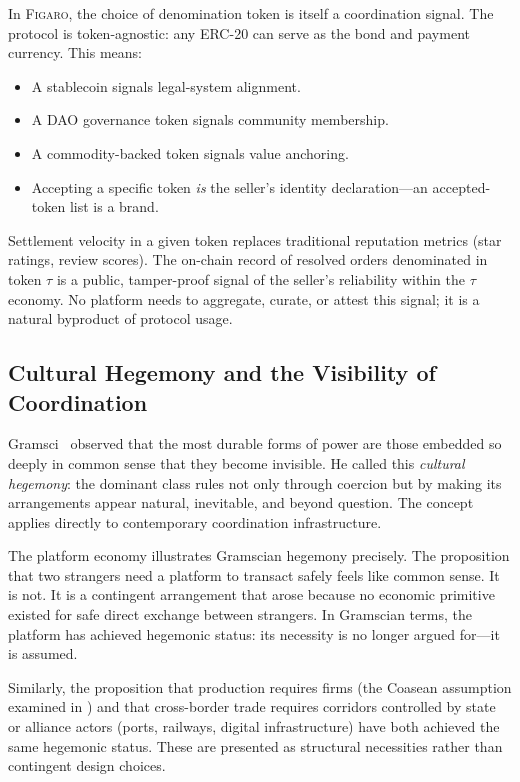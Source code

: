 \documentclass[11pt,a4paper]{article}
\theoremstyle{definition}
\theoremstyle{remark}
\newcommand{\figaro}{\textsc{Figaro}}
\begin{document}
In \figaro{}, the choice of denomination token is itself a coordination
signal. The protocol is token-agnostic: any ERC-20 can serve as
the bond and payment currency. This means:

\begin{itemize}
  \item A stablecoin signals legal-system alignment.
  \item A DAO governance token signals community membership.
  \item A commodity-backed token signals value anchoring.
  \item Accepting a specific token \emph{is} the seller's identity
    declaration---an accepted-token list is a brand.
\end{itemize}

Settlement velocity in a given token replaces traditional reputation
metrics (star ratings, review scores). The on-chain record of resolved
orders denominated in token $\tau$ is a public, tamper-proof signal of
the seller's reliability within the $\tau$ economy. No platform needs to
aggregate, curate, or attest this signal; it is a natural byproduct of
protocol usage.

\subsection{Cultural Hegemony and the Visibility of Coordination}

Gramsci~\citeyearpar{gramsci1971} observed that the most durable forms of
power are those embedded so deeply in common sense that they become
invisible. He called this \emph{cultural hegemony}: the dominant class
rules not only through coercion but by making its arrangements appear
natural, inevitable, and beyond question. The concept applies directly
to contemporary coordination infrastructure.

The platform economy illustrates Gramscian hegemony precisely. The
proposition that two strangers need a platform to transact safely feels
like common sense. It is not. It is a contingent arrangement that arose
because no economic primitive existed for safe direct exchange between
strangers. In Gramscian terms, the platform has achieved hegemonic
status: its necessity is no longer argued for---it is assumed.

Similarly, the proposition that production requires firms (the Coasean
assumption examined in ) and that cross-border
trade requires corridors controlled by state or alliance actors
(ports, railways, digital infrastructure) have both achieved the same
hegemonic status. These are presented as structural necessities rather
than contingent design choices.
\end{document}
